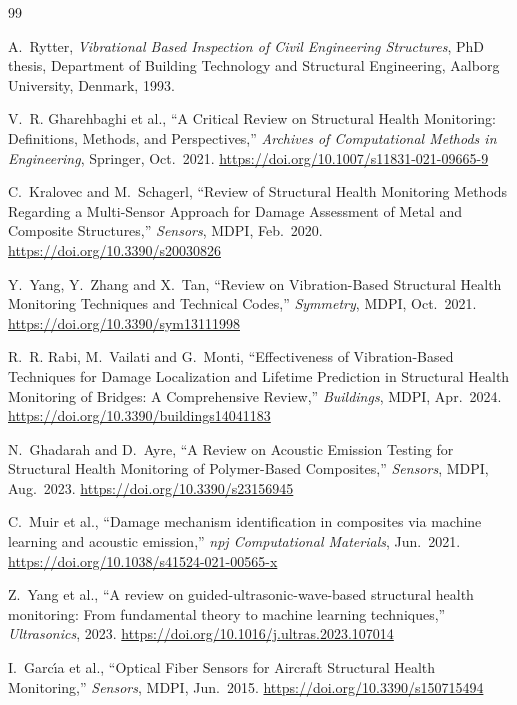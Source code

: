 \begin{thebibliography}{99}
\small

A.~Rytter, \emph{Vibrational Based Inspection of Civil Engineering Structures}, PhD thesis, Department of
Building Technology and Structural Engineering, Aalborg University, Denmark, 1993.

V.~R. Gharehbaghi et al., ``A Critical Review on Structural Health Monitoring: Definitions, Methods, and
Perspectives,'' \emph{Archives of Computational Methods in Engineering}, Springer, Oct.~2021.
\url{https://doi.org/10.1007/s11831-021-09665-9}

C.~Kralovec and M.~Schagerl, ``Review of Structural Health Monitoring Methods Regarding a Multi-Sensor
Approach for Damage Assessment of Metal and Composite Structures,'' \emph{Sensors}, MDPI, Feb.~2020.
\url{https://doi.org/10.3390/s20030826}

Y.~Yang, Y.~Zhang and X.~Tan, ``Review on Vibration-Based Structural Health Monitoring Techniques and
Technical Codes,'' \emph{Symmetry}, MDPI, Oct.~2021. \url{https://doi.org/10.3390/sym13111998}

R.~R. Rabi, M.~Vailati and G.~Monti, ``Effectiveness of Vibration-Based Techniques for Damage Localization
and Lifetime Prediction in Structural Health Monitoring of Bridges: A Comprehensive Review,''
\emph{Buildings}, MDPI, Apr.~2024. \url{https://doi.org/10.3390/buildings14041183}

N.~Ghadarah and D.~Ayre, ``A Review on Acoustic Emission Testing for Structural Health Monitoring of
Polymer-Based Composites,'' \emph{Sensors}, MDPI, Aug.~2023. \url{https://doi.org/10.3390/s23156945}

C.~Muir et al., ``Damage mechanism identification in composites via machine learning and acoustic
emission,'' \emph{npj Computational Materials}, Jun.~2021.
\url{https://doi.org/10.1038/s41524-021-00565-x}

Z.~Yang et al., ``A review on guided-ultrasonic-wave-based structural health monitoring: From fundamental
theory to machine learning techniques,'' \emph{Ultrasonics}, 2023.
\url{https://doi.org/10.1016/j.ultras.2023.107014}

I.~Garc\'{\i}a et al., ``Optical Fiber Sensors for Aircraft Structural Health Monitoring,'' \emph{Sensors},
MDPI, Jun.~2015. \url{https://doi.org/10.3390/s150715494}


\end{thebibliography}
